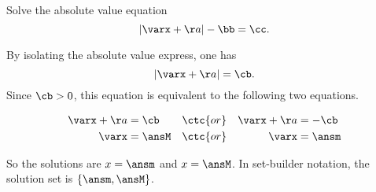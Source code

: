 


\edef\varx{\varx}




\pgfmathtruncatemacro{\cb}{\cc+\bb}
\pgfmathtruncatemacro{\ansM}{\cb-\aa}
\pgfmathtruncatemacro{\ansm}{-\cb-\aa}



Solve the absolute value equation 
\[|\varx + \aa| - \bb  = \cc.\]

\begin{solution}

By isolating the absolute value express, one has 
\[|\varx + \aa| = \cb.\]
Since $\cb>0$, this equation is equivalent to the following two equations.

\begin{center}
	\begin{alignat*}{3}
		\varx + \aa&=\cb &&\ctc{ or } & \varx + \aa&=-\cb\\
		\varx&=\ansM && \ctc{or} & \varx&=\ansm\\
	\end{alignat*}
\end{center} 
So the solutions are $x=\ansm$ and $x=\ansM$. In set-builder notation, the solution set is 
$\{\ansm, \ansM\}$.
\end{solution}

